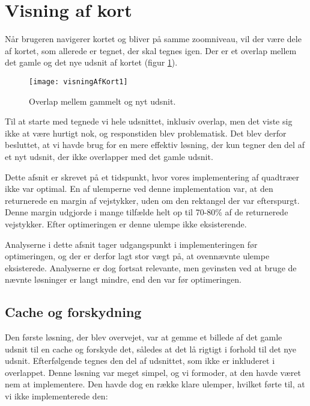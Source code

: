\section{Visning af kort}
\label{sec:visningAfKort}

Når brugeren navigerer kortet og bliver på samme zoomniveau, vil der være dele af kortet, som allerede er tegnet, der skal tegnes igen. Der er et overlap mellem det gamle og det nye udsnit af kortet (figur \ref{figur:visningAfKort1}).

\begin{figure}[h]
	\centering
	\texttt{[image: visningAfKort1]}
	\captionsetup{width=0.8\textwidth}
	\caption{Overlap mellem gammelt og nyt udsnit.}
	\label{figur:visningAfKort1}
\end{figure}

Til at starte med tegnede vi hele udsnittet, inklusiv overlap, men det viste sig ikke at være hurtigt nok, og responstiden blev problematisk. Det blev derfor besluttet, at vi havde brug for en mere effektiv løsning, der kun tegner den del af et nyt udsnit, der ikke overlapper med det gamle udsnit.

Dette afsnit er skrevet på et tidspunkt, hvor vores implementering af quadtræer ikke var optimal. En af ulemperne ved denne implementation var, at den returnerede en margin af vejstykker, uden om den rektangel der var efterspurgt. Denne margin udgjorde i mange tilfælde helt op til 70-80\% af de returnerede vejstykker. Efter optimeringen er denne ulempe ikke eksisterende.

Analyserne i dette afsnit tager udgangspunkt i implementeringen før optimeringen, og der er derfor lagt stor vægt på, at ovennævnte ulempe eksisterede. Analyserne er dog fortsat relevante, men gevinsten ved at bruge de nævnte løsninger er langt mindre, end den var før optimeringen.

\subsection{Cache og forskydning}
\label{subsec:cacheOgForskydning}

Den første løsning, der blev overvejet, var at gemme et billede af det gamle udsnit til en cache og forskyde det, således at det lå rigtigt i forhold til det nye udsnit. Efterfølgende tegnes den del af udsnittet, som ikke er inkluderet i overlappet. Denne løsning var meget simpel, og vi formoder, at den havde været nem at implementere. Den havde dog en række klare ulemper, hvilket førte til, at vi ikke implementerede den:

